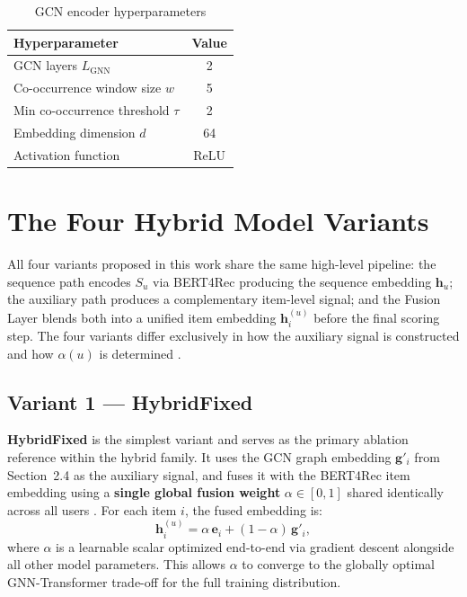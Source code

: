 \documentclass[12pt,a4paper]{report}
\newcommand{\parencite}[1]{\citep{#1}}
\begin{document}
\begin{table}[h]
\centering
\caption{GCN encoder hyperparameters}
\small
\begin{tabular}{lc}
\toprule
\textbf{Hyperparameter} & \textbf{Value} \\
\midrule
GCN layers $L_{\text{GNN}}$         & 2 \\
Co-occurrence window size $w$        & 5 \\
Min co-occurrence threshold $\tau$   & 2 \\
Embedding dimension $d$              & 64 \\
Activation function                  & ReLU \\
\bottomrule
\end{tabular}
\end{table}

\section{The Four Hybrid Model Variants}

All four variants proposed in this work share the same high-level
pipeline: the sequence path encodes $S_u$ via BERT4Rec producing
the sequence embedding $\mathbf{h}_u$; the auxiliary path produces
a complementary item-level signal; and the Fusion Layer blends
both into a unified item embedding $\mathbf{h}_i^{(u)}$ before the
final scoring step. The four variants differ exclusively in how
the auxiliary signal is constructed and how $\alpha(u)$ is
determined \parencite{ouledmeriem2025hybrid}.

\subsection{Variant 1 — HybridFixed}

\textbf{HybridFixed} is the simplest variant and serves as the
primary ablation reference within the hybrid family. It uses the
GCN graph embedding $\mathbf{g}'_i$ from Section~2.4 as the
auxiliary signal, and fuses it with the BERT4Rec item embedding
using a \textbf{single global fusion weight} $\alpha \in [0,1]$
shared identically across all users \parencite{ouledmeriem2025hybrid}.
For each item $i$, the fused embedding is:
\begin{equation}
  \mathbf{h}_i^{(u)} = \alpha\, \mathbf{e}_i
                      + (1 - \alpha)\, \mathbf{g}'_i,
\end{equation}
where $\alpha$ is a learnable scalar optimized end-to-end via
gradient descent alongside all other model parameters. This
allows $\alpha$ to converge to the globally optimal
GNN-Transformer trade-off for the full training distribution.
\end{document}
